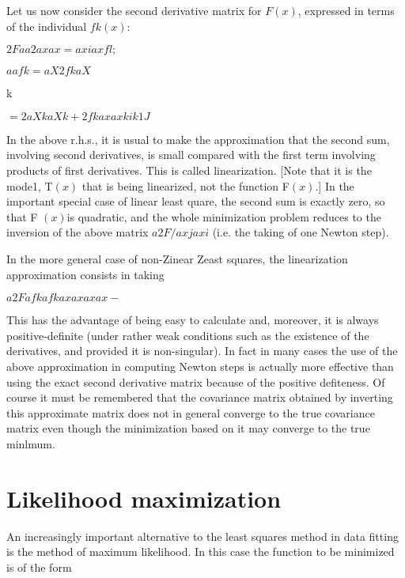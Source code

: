      Let us now consider the second derivative matrix for $F(x)$, expressed
in terms of the individual $fk(x)$:
 
             $   2F a a 2
              ax ax  = axi ax   fl;$
 
                                        $   a        afk
                    = aX  2fk aX$
 
                              k
 
 
                  $=   2 aXk aXk +  2fk ax ax
                           k      i       k        1  J$
 
 
In the above r.h.s., it is usual to make the approximation that the
second sum, involving second derivatives, is small compared with the
first term involving products of first derivatives.  This is called
linearization.  [Note that it is the mode1, T$(x)$ that is being linearized,
not the function F$(x).$]  In the important special case of linear least
quare, the second sum is exactly zero, so that F $(x)$is quadratic, and
the whole minimization problem reduces to the inversion of the above
matrix $a2F/axjaxi$ (i.e. the taking of one Newton step).
 
 
     In the more general case of non-Zinear Zeast squares, the
linearization approximation consists in taking
 
                     $a2F        afk afk
                     ax ax   ax ax -$
 
This has the advantage of being easy to calculate and, moreover, it is
always positive-definite (under rather weak conditions such as the
existence of the derivatives, and provided it is non-singular). In fact
in many cases the use of the above approximation in computing Newton
steps is actually more effective than using the exact second derivative
matrix because of the positive defiteness.  Of course it must be
remembered that the covariance matrix obtained by inverting this
approximate
matrix does not in general converge to the true covariance matrix
even though the minimization  based on it may converge to the true
minlmum.
 
\section{Likelihood maximization}
 
     An increasingly important alternative to the least squares method
in data fitting is the method of maximum likelihood.  In this case the
function to be minimized is of the form
 
